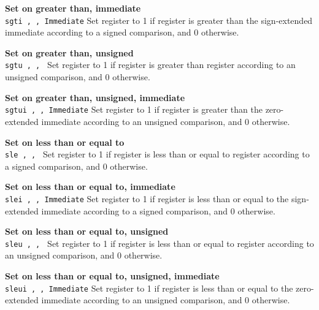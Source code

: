 \noindent
{\bf Set on greater than, immediate}\\
\noindent
\texttt{sgti \regd, \regs, Immediate}
Set register \regd{} to 1 if register \regs{} is
greater than the sign-extended immediate according to a signed comparison, and 0 otherwise.
\vspace{3ex}

\noindent
{\bf Set on greater than, unsigned}\\
\noindent
\texttt{sgtu \regd, \regs, \regt}
Set register \regd{} to 1 if register \regs{} is
greater than register \regt{} according to an unsigned comparison, and 0 otherwise.
\vspace{3ex}

\noindent
{\bf Set on greater than, unsigned, immediate}\\
\noindent
\texttt{sgtui \regd, \regs, Immediate}
Set register \regd{} to 1 if register \regs{} is
greater than the zero-extended immediate according to an unsigned comparison, and 0 otherwise.
\vspace{3ex}

\noindent
{\bf Set on less than or equal to}\\
\noindent
\texttt{sle \regd, \regs, \regt}
Set register \regd{} to 1 if register \regs{} is
less than or equal to register \regt{} according to a signed comparison, and 0 otherwise.
\vspace{3ex}

\noindent
{\bf Set on less than or equal to, immediate}\\
\noindent
\texttt{slei \regd, \regs, Immediate}
Set register \regd{} to 1 if register \regs{} is
less than or equal to the sign-extended immediate according to a signed comparison, and 0 otherwise.
\vspace{3ex}
\newpage

\noindent
{\bf Set on less than or equal to, unsigned}\\
\noindent
\texttt{sleu \regd, \regs, \regt}
Set register \regd{} to 1 if register \regs{} is
less than or equal to register \regt{} according to an unsigned comparison, and 0 otherwise.
\vspace{3ex}

\noindent
{\bf Set on less than or equal to, unsigned, immediate}\\
\noindent
\texttt{sleui \regd, \regs, Immediate}
Set register \regd{} to 1 if register \regs{} is
less than or equal to the zero-extended immediate according to an unsigned comparison, and 0 otherwise.
\vspace{3ex}

